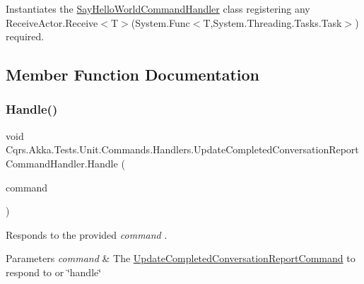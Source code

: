 Instantiates the \hyperlink{classCqrs_1_1Akka_1_1Tests_1_1Unit_1_1Commands_1_1Handlers_1_1SayHelloWorldCommandHandler}{Say\+Hello\+World\+Command\+Handler} class registering any Receive\+Actor.\+Receive$<$\+T$>$(\+System.\+Func$<$\+T,\+System.\+Threading.\+Tasks.\+Task$>$) required. 



\subsection{Member Function Documentation}
\mbox{\label{classCqrs_1_1Akka_1_1Tests_1_1Unit_1_1Commands_1_1Handlers_1_1UpdateCompletedConversationReportCommandHandler_aecb596ab5c5e17823b93ac4fcae0e43e_aecb596ab5c5e17823b93ac4fcae0e43e}} 
\subsubsection{\texorpdfstring{Handle()}{Handle()}}
{\footnotesize\ttfamily void Cqrs.\+Akka.\+Tests.\+Unit.\+Commands.\+Handlers.\+Update\+Completed\+Conversation\+Report\+Command\+Handler.\+Handle (\begin{DoxyParamCaption}\item[{\hyperlink{classCqrs_1_1Akka_1_1Tests_1_1Unit_1_1Commands_1_1UpdateCompletedConversationReportCommand}{Update\+Completed\+Conversation\+Report\+Command}}]{command }\end{DoxyParamCaption})}



Responds to the provided {\itshape command} . 


\begin{DoxyParams}{Parameters}
{\em command} & The \hyperlink{classCqrs_1_1Akka_1_1Tests_1_1Unit_1_1Commands_1_1UpdateCompletedConversationReportCommand}{Update\+Completed\+Conversation\+Report\+Command} to respond to or \char`\"{}handle\char`\"{}\\
\hline
\end{DoxyParams}


